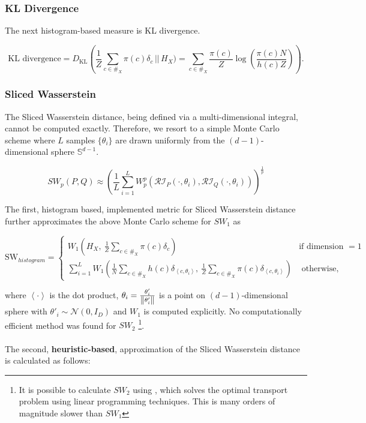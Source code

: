 \subsubsection{KL Divergence}
The next histogram-based measure is KL divergence.

\[\text{KL divergence} = D_{\text{KL}} \left( \frac 1 Z \sum_{c \in \#_X} \pi(c) \delta_c \,\bigg|\bigg| \, H_X) =  \sum_{c \in \#_X} \frac{\pi(c)}{Z} \log\left(\frac{\pi(c) N}{h(c) Z} \right)\right) .\]

\subsubsection{Sliced Wasserstein}

The Sliced Wasserstein distance, being defined via a multi-dimensional integral, cannot be computed exactly. Therefore, we resort to a simple Monte Carlo scheme where $L$ samples $\{\theta_i\}$ are drawn uniformly from the $(d-1)$-dimensional sphere $\mathbb S^{d-1}$.

$$ 
SW_p(P, Q) \approx \left( \frac 1 L \sum_{i=1}^L W_p^p\left(\mathcal{RI}_P(\cdot, \theta_i), \mathcal{RI}_Q(\cdot, \theta_i) \right) \right)^{\frac 1 p}
$$

The first, histogram based, implemented metric for Sliced Wasserstein distance further approximates the above Monte Carlo scheme for $SW_1$ as

\[\text{SW}_{histogram} = \begin{cases}
W_1 \left( H_X,\  \frac 1 Z \sum_{c \in \#_X} \pi(c) \delta_c \right) & \text{if dimension } = 1 \\
\sum_{i = 1}^L W_1 \left( \frac 1 N \sum_{c \in \#_X} h(c) \delta_{\left<c, \theta_i \right>},\  \frac 1 Z \sum_{c \in \#_X} \pi(c) \delta_{\left<c, \theta_i \right>}  \right) & \text{ otherwise, }
\end{cases}\]

where $\left< \cdot \right>$ is the dot product, $\theta_i = \frac{\theta'_i}{\norm{\theta'_i}}$ is a point on $(d-1)$-dimensional sphere with $
\theta'_i \sim \mathcal N(0, I_D)$ and $W_1$ is computed explicitly.   No computationally efficient method was found for $SW_2$ \footnote{It is possible to calculate $SW_2$ using \cite{flamary2017pot}, which solves the optimal transport problem using linear programming techniques.  This is many orders of magnitude slower than $SW_1$}.   \\\\

The second, \textbf{heuristic-based}, approximation of the Sliced Wasserstein distance is calculated as follows:

